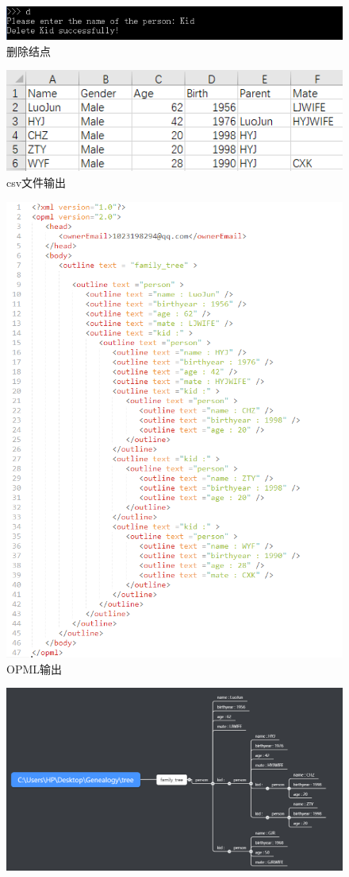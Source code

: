 \documentclass[12pt,UTF8]{ctexart}
\begin{document}
\begin{spacing}{1.4}
\begin{figure}[htbp]
\centering
\includegraphics[width=0.6\linewidth]{fig/delete.PNG}
\caption{删除结点}
\label{fig:delete}
\end{figure}
\begin{figure}[htbp]
\centering
\includegraphics[width=0.8\linewidth]{fig/csv.PNG}
\caption{csv文件输出}
\label{fig:csv}
\end{figure}
\begin{figure}[htbp]
\centering
\includegraphics[width=0.8\linewidth]{fig/opml.PNG}
\caption{OPML输出}
\label{fig:opml}
\end{figure}
\begin{figure}[htbp]
\centering
\includegraphics[width=\linewidth]{fig/family_tree.png}

\end{figure}
\end{spacing}
\end{document}
